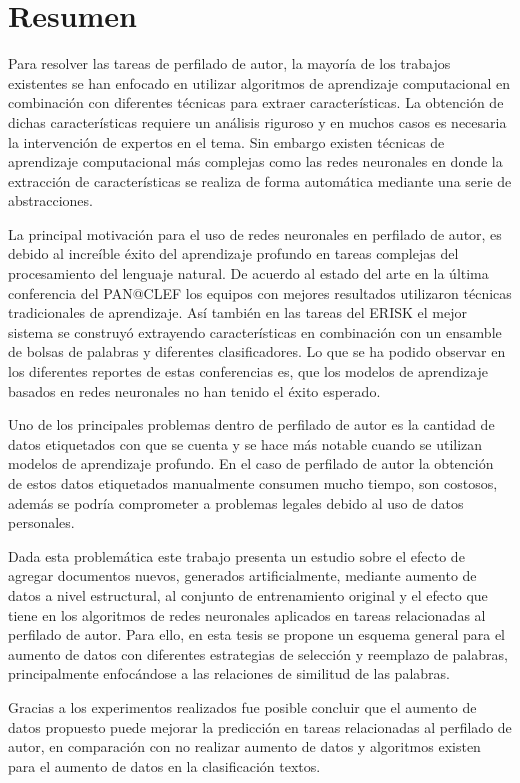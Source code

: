 \chapter{Resumen}

Para resolver las tareas de perfilado de autor, la mayoría de los trabajos existentes se han enfocado en utilizar algoritmos de aprendizaje computacional en combinación con diferentes técnicas para extraer características. La obtención de dichas características requiere un análisis riguroso y en muchos casos es necesaria la intervención de expertos en el tema. Sin embargo existen técnicas de aprendizaje computacional más complejas como las redes neuronales en donde la extracción de características se realiza de forma automática mediante una serie de abstracciones.

La principal motivación para el uso de redes neuronales en perfilado de autor, es debido al increíble éxito del aprendizaje profundo en tareas complejas del procesamiento del  lenguaje natural. De acuerdo al estado del arte en la última conferencia del PAN@CLEF los equipos con mejores resultados utilizaron técnicas tradicionales de aprendizaje. Así también en las tareas del ERISK el mejor sistema se construyó extrayendo características en combinación con un ensamble de bolsas de palabras y diferentes clasificadores. Lo que se ha podido observar en los diferentes reportes de estas conferencias es, que los modelos de aprendizaje basados en redes neuronales no han tenido el éxito esperado. 

Uno de los principales problemas dentro de perfilado de autor es la cantidad de datos etiquetados con que se cuenta y se hace más notable cuando se utilizan modelos de aprendizaje profundo. En el caso de perfilado de autor la obtención de estos datos etiquetados manualmente consumen mucho tiempo, son costosos, además se podría comprometer a problemas legales debido al uso de datos personales. 

Dada esta problemática este trabajo presenta un estudio sobre el efecto de agregar documentos nuevos, generados artificialmente, mediante aumento de datos a nivel estructural, al  conjunto de entrenamiento original y el efecto que tiene en los algoritmos de redes neuronales aplicados en tareas relacionadas al perfilado de autor. Para ello, en esta tesis se propone un esquema general para el aumento de datos con diferentes estrategias de selección y reemplazo de palabras, principalmente enfocándose a las relaciones de similitud de las palabras. 

Gracias a los experimentos realizados fue posible concluir que el aumento de datos propuesto puede mejorar la predicción en tareas relacionadas al perfilado de autor, en comparación con no realizar aumento de datos y algoritmos existen para el aumento de datos en la clasificación textos.

